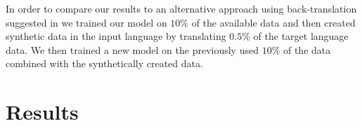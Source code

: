 \documentclass[11pt,a4paper]{article}
\begin{document}



In order to compare our results to an alternative approach using back-translation suggested in \cite{backtrans} we trained our model on $10\%$ of the available data and then created synthetic data in the input language by translating $0.5\%$ of the target language data. We then trained a new model on the previously used $10\%$ of the data combined with the synthetically created data.

\section{Results}\label{sec:results}
\end{document}
